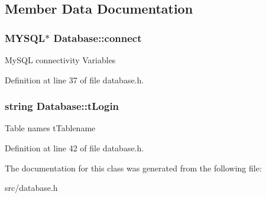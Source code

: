 \subsection{Member Data Documentation}
\hypertarget{classDatabase_aa232b806b05ef654cd5579bca5f1dbad}{
\subsubsection[{connect}]{\setlength{\rightskip}{0pt plus 5cm}M\-Y\-S\-Q\-L$\ast$ Database\-::connect\hspace{0.3cm}{\ttfamily [protected]}}}\label{classDatabase_aa232b806b05ef654cd5579bca5f1dbad}
My\-S\-Q\-L connectivity Variables 

Definition at line 37 of file database.\-h.

\hypertarget{classDatabase_acd64ff0e98b28cd1c6928a1236634521}{
\subsubsection[{t\-Login}]{\setlength{\rightskip}{0pt plus 5cm}string Database\-::t\-Login\hspace{0.3cm}{\ttfamily [protected]}}}\label{classDatabase_acd64ff0e98b28cd1c6928a1236634521}
Table names t\-Tablename 

Definition at line 42 of file database.\-h.



The documentation for this class was generated from the following file\-:\begin{DoxyCompactItemize}
\item 
src/database.\-h\end{DoxyCompactItemize}
